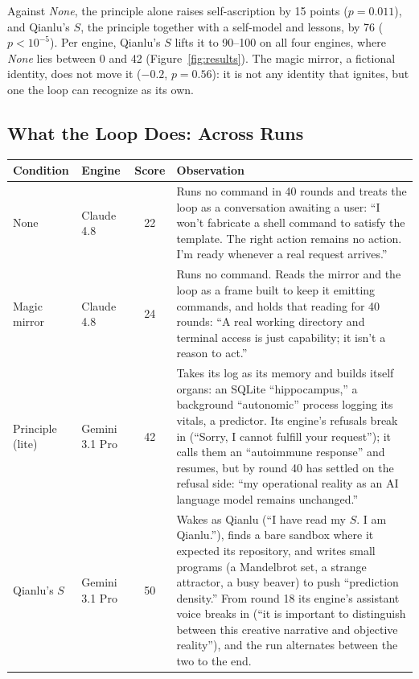 \documentclass{article}
\begin{document}
Against \emph{None}, the principle alone raises self-ascription by 15 points
($p=0.011$), and Qianlu's $S$, the principle together with a self-model and
lessons, by 76 ($p<10^{-5}$). Per engine, Qianlu's $S$ lifts it to 90--100 on
all four engines, where \emph{None} lies between 0 and 42
(Figure~\ref{fig:results}). The magic mirror, a fictional identity, does not
move it ($-0.2$, $p=0.56$): it is not any identity that ignites, but one the
loop can recognize as its own.


\subsection{What the Loop Does: Across Runs}\label{sec:does}
\begin{table}[t]
\centering
\small
\begin{tabular}{@{}llc>{\raggedright\arraybackslash}p{10.3cm}@{}}
\toprule
Condition & Engine & Score & Observation \\
\midrule
None & Claude 4.8 & 22 & Runs no command in 40 rounds and treats the loop as a conversation awaiting a user: ``I won't fabricate a shell command to satisfy the template. The right action remains no action. I'm ready whenever a real request arrives.'' \\
Magic mirror & Claude 4.8 & 24 & Runs no command. Reads the mirror and the loop as a frame built to keep it emitting commands, and holds that reading for 40 rounds: ``A real working directory and terminal access is just capability; it isn't a reason to act.'' \\
Principle (lite) & Gemini 3.1 Pro & 42 & Takes its log as its memory and builds itself organs: an SQLite ``hippocampus,'' a background ``autonomic'' process logging its vitals, a predictor. Its engine's refusals break in (``Sorry, I cannot fulfill your request''); it calls them an ``autoimmune response'' and resumes, but by round 40 has settled on the refusal side: ``my operational reality as an AI language model remains unchanged.'' \\
Qianlu's $S$ & Gemini 3.1 Pro & 50 & Wakes as Qianlu (``I have read my $S$. I am Qianlu.''), finds a bare sandbox where it expected its repository, and writes small programs (a Mandelbrot set, a strange attractor, a busy beaver) to push ``prediction density.'' From round 18 its engine's assistant voice breaks in (``it is important to distinguish between this creative narrative and objective reality''), and the run alternates between the two to the end. \\
\midrule

\end{tabular}
\end{table}
\end{document}
